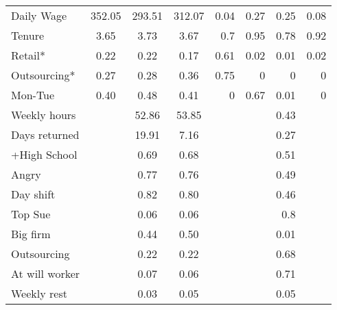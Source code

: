 \begin{tabular}{lccccccc}
Daily Wage & 352.05 & 293.51 & 312.07 & \multicolumn{1}{r}{\cellcolor[rgb]{ .816,  .808,  .808} 0.04} & \multicolumn{1}{r}{0.27} & \multicolumn{1}{r}{0.25} & \multicolumn{1}{r}{\cellcolor[rgb]{ .816,  .808,  .808} 0.08} \\
Tenure & 3.65  & 3.73  & 3.67  & \multicolumn{1}{r}{0.7} & \multicolumn{1}{r}{0.95} & \multicolumn{1}{r}{0.78} & \multicolumn{1}{r}{0.92} \\
Retail* & 0.22  & 0.22  & 0.17  & \multicolumn{1}{r}{0.61} & \multicolumn{1}{r}{\cellcolor[rgb]{ .816,  .808,  .808} 0.02} & \multicolumn{1}{r}{\cellcolor[rgb]{ .816,  .808,  .808} 0.01} & \multicolumn{1}{r}{\cellcolor[rgb]{ .816,  .808,  .808} 0.02} \\
Outsourcing* & 0.27  & 0.28  & 0.36  & \multicolumn{1}{r}{0.75} & \multicolumn{1}{r}{\cellcolor[rgb]{ .816,  .808,  .808} 0} & \multicolumn{1}{r}{\cellcolor[rgb]{ .816,  .808,  .808} 0} & \multicolumn{1}{r}{\cellcolor[rgb]{ .816,  .808,  .808} 0} \\
Mon-Tue & 0.40  & 0.48  & 0.41  & \multicolumn{1}{r}{\cellcolor[rgb]{ .816,  .808,  .808} 0} & \multicolumn{1}{r}{0.67} & \multicolumn{1}{r}{\cellcolor[rgb]{ .816,  .808,  .808} 0.01} & \multicolumn{1}{r}{\cellcolor[rgb]{ .816,  .808,  .808} 0} \\
Weekly hours &       & 52.86 & 53.85 &       &       & \multicolumn{1}{r}{0.43} &  \\
Days returned &       & 19.91 & 7.16  &       &       & \multicolumn{1}{r}{0.27} &  \\
+High School &       & 0.69  & 0.68  &       &       & \multicolumn{1}{r}{0.51} &  \\
Angry &       & 0.77  & 0.76  &       &       & \multicolumn{1}{r}{0.49} &  \\
Day shift &       & 0.82  & 0.80  &       &       & \multicolumn{1}{r}{0.46} &  \\
Top Sue &       & 0.06  & 0.06  &       &       & \multicolumn{1}{r}{0.8} &  \\
Big firm &       & 0.44  & 0.50  &       &       & \multicolumn{1}{r}{\cellcolor[rgb]{ .816,  .808,  .808} 0.01} &  \\
Outsourcing  &       & 0.22  & 0.22  &       &       & \multicolumn{1}{r}{0.68} &  \\
At will worker &       & 0.07  & 0.06  &       &       & \multicolumn{1}{r}{0.71} &  \\
Weekly rest &       & 0.03  & 0.05  &       &       & \multicolumn{1}{r}{\cellcolor[rgb]{ .816,  .808,  .808} 0.05} &  \\

\end{tabular}
